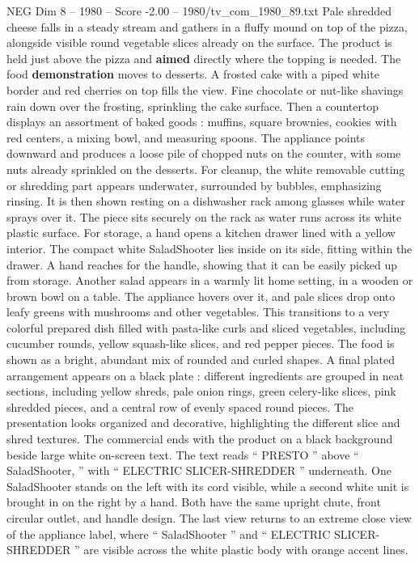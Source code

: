 \begin{textsample}{NEG Dim 8 – 1980 – Score -2.00 – 1980/tv\_com\_1980\_89.txt}
Pale shredded cheese falls in a steady stream and gathers in a fluffy mound on top of the pizza, alongside visible round vegetable slices already on the surface.
The product is held just above the pizza and \textbf{aimed} directly where the topping is needed.
The food \textbf{demonstration} moves to desserts.
A frosted cake with a piped white border and red cherries on top fills the view.
Fine chocolate or nut-like shavings rain down over the frosting, sprinkling the cake surface.
Then a countertop displays an assortment of baked goods : muffins, square brownies, cookies with red centers, a mixing bowl, and measuring spoons.
The appliance points downward and produces a loose pile of chopped nuts on the counter, with some nuts already sprinkled on the desserts.
For cleanup, the white removable cutting or shredding part appears underwater, surrounded by bubbles, emphasizing rinsing.
It is then shown resting on a dishwasher rack among glasses while water sprays over it.
The piece sits securely on the rack as water runs across its white plastic surface.
For storage, a hand opens a kitchen drawer lined with a yellow interior.
The compact white SaladShooter lies inside on its side, fitting within the drawer.
A hand reaches for the handle, showing that it can be easily picked up from storage.
Another salad appears in a warmly lit home setting, in a wooden or brown bowl on a table.
The appliance hovers over it, and pale slices drop onto leafy greens with mushrooms and other vegetables.
This transitions to a very colorful prepared dish filled with pasta-like curls and sliced vegetables, including cucumber rounds, yellow squash-like slices, and red pepper pieces.
The food is shown as a bright, abundant mix of rounded and curled shapes.
A final plated arrangement appears on a black plate : different ingredients are grouped in neat sections, including yellow shreds, pale onion rings, green celery-like slices, pink shredded pieces, and a central row of evenly spaced round pieces.
The presentation looks organized and decorative, highlighting the different slice and shred textures.
The commercial ends with the product on a black background beside large white on-screen text.
The text reads “ PRESTO ” above “ SaladShooter, ” with “ ELECTRIC SLICER-SHREDDER ” underneath.
One SaladShooter stands on the left with its cord visible, while a second white unit is brought in on the right by a hand.
Both have the same upright chute, front circular outlet, and handle design.
The last view returns to an extreme close view of the appliance label, where “ SaladShooter ” and “ ELECTRIC SLICER-SHREDDER ” are visible across the white plastic body with orange accent lines.

\end{textsample}
